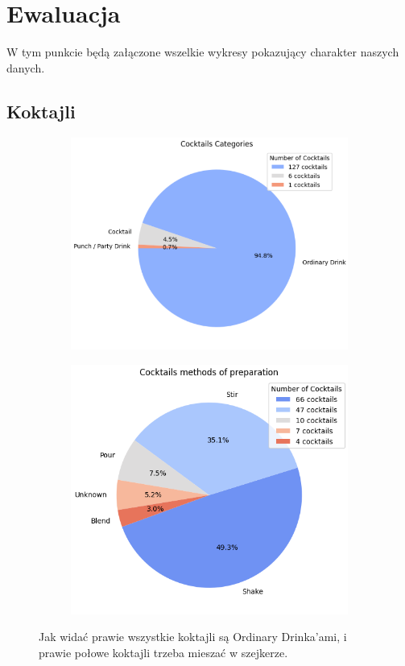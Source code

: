 \documentclass{article}
\begin{document}
\section{Ewaluacja}
W tym punkcie będą załączone wszelkie wykresy pokazujący charakter naszych danych.
\subsection{Koktajli}
\begin{figure}[ht]
    \centering
    \begin{subfigure}{0.45\textwidth}
        \centering
        \includegraphics[width=\textwidth]{c_p_1.png}
        \label{fig:image1}
    \end{subfigure}
    \hfill
    \begin{subfigure}{0.38\textwidth}
        \centering
        \includegraphics[width=\textwidth]{c_p_2.png}
        \label{fig:image2}
    \end{subfigure}
    \caption{Jak widać prawie wszystkie koktajli są Ordinary Drinka'ami, i prawie połowe koktajli trzeba mieszać w szejkerze.}
\end{figure}
\end{document}
